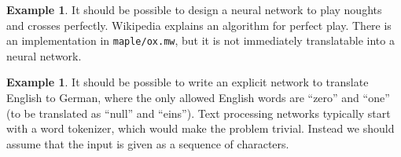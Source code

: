 \documentclass{amsart}
\renewcommand{\:}{\colon}
\theoremstyle{definition}
\newtheorem{example}[theorem]{Example}
\begin{document}
\begin{example}\label{eg-ox}
 It should be possible to design a neural network to play noughts and
 crosses perfectly.  Wikipedia explains an algorithm for perfect play.
 There is an implementation in \texttt{maple/ox.mw}, but it is not
 immediately translatable into a neural network.
\end{example}

\begin{example}\label{eg-binary-words}
 It should be possible to write an explicit network to translate
 English to German, where the only allowed English words are ``zero''
 and ``one'' (to be translated as ``null'' and ``eins'').  Text
 processing networks typically start with a word tokenizer, which
 would make the problem trivial.  Instead we should assume that the
 input is given as a sequence of characters.
\end{example}
\end{document}
